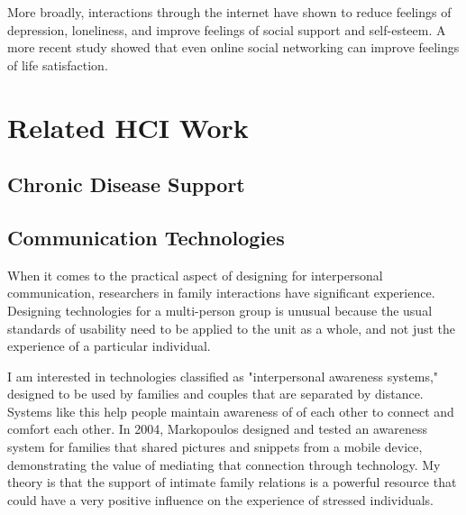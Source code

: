     More broadly, interactions through the internet have shown to reduce feelings of depression, loneliness,
    and improve feelings of social support and self-esteem.
    \cite{shaw_02}
    A more recent study showed that even online social networking can improve
    feelings of life satisfaction. \cite{hjo_14}

\section{Related HCI Work}
  \subsection{Chronic Disease Support}


  \subsection{Communication Technologies}
    When it comes to the practical aspect of designing for interpersonal
    communication, researchers in family interactions have significant experience.
    Designing technologies for a multi-person group is unusual because the usual
    standards of usability need to be applied to the unit as a whole, and not just
    the experience of a particular individual. \cite{neustaedter12}

    I am interested in technologies classified as "interpersonal awareness systems,"
    designed to be used by families and couples that are separated by distance.
    Systems like this help people maintain awareness of  of each other to connect
    and comfort each other. \cite{neustaedter06}
    In 2004, Markopoulos designed and tested an
    awareness system for families that shared pictures and snippets from a mobile
    device, demonstrating the value of mediating that connection through technology.
    \cite{markopoulos04}
    My theory is that the support of intimate family relations is a powerful
    resource that could
    have a very positive influence on the experience of stressed individuals.
